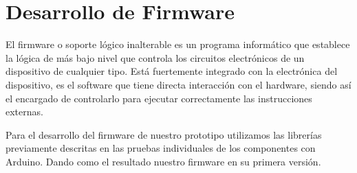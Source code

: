 \section{Desarrollo de Firmware}
\par 
El firmware o soporte lógico inalterable es un programa informático que establece la lógica de más bajo nivel que controla los circuitos electrónicos de un dispositivo de cualquier tipo. Está fuertemente integrado con la electrónica del dispositivo, es el software que tiene directa interacción con el hardware, siendo así el encargado de controlarlo para ejecutar correctamente las instrucciones externas.\cite{firmware}

\par \noindent
Para el desarrollo del firmware de nuestro prototipo utilizamos las librerías previamente descritas en las pruebas individuales de los componentes con Arduino. Dando como el resultado nuestro firmware en su primera versión.

